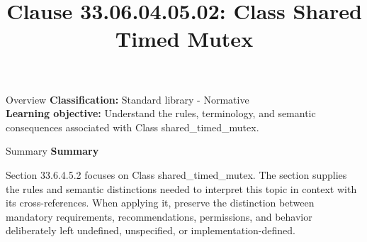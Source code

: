 \documentclass[10pt,letterpaper]{article}
\title{Clause 33.06.04.05.02: Class Shared Timed Mutex}
\author{}
\date{}
\begin{document}
\maketitle
\begin{CornellOverviewBox}{Overview}
\textbf{Classification:} Standard library - Normative\\[2pt]
\textbf{Learning objective:} Understand the rules, terminology, and semantic consequences associated with Class shared\_timed\_mutex.
\end{CornellOverviewBox}\begin{CornellSummaryBox}{Summary}
{\sffamily\bfseries\color{Accent} Summary}\par\vspace{3pt}Section 33.6.4.5.2 focuses on Class shared\_timed\_mutex. The section supplies the rules and semantic distinctions needed to interpret this topic in context with its cross-references. When applying it, preserve the distinction between mandatory requirements, recommendations, permissions, and behavior deliberately left undefined, unspecified, or implementation-defined.
\end{CornellSummaryBox}
\end{document}
